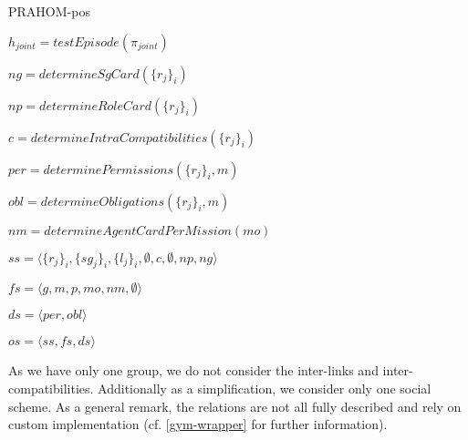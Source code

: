 \documentclass{ecai}
\newcounter{relation}
\begin{document}
\begin{algorithm}[hbt!]
    \caption{PRAHOM-pos}\label{alg:PRAHOM-pos}

    $h_{joint} = testEpisode(\pi_{joint})$


    $ng = determineSgCard(\{r_j\}_i)$

    $np = determineRoleCard(\{r_j\}_i)$

    $c = determineIntraCompatibilities(\{r_j\}_i)$

    $per = determinePermissions(\{r_j\}_i, m)$

    $obl = determineObligations(\{r_j\}_i, m)$

    $nm = determineAgentCardPerMission(mo)$

    $ss = \langle \{r_j\}_i, \{sg_j\}_i, \{l_j\}_i, \emptyset, c, \emptyset, np, ng \rangle$

    $fs = \langle {g, m, p, mo, nm}, \emptyset \rangle$

    $ds = \langle per, obl \rangle$

    $os = \langle ss, fs, ds \rangle$

\end{algorithm}

As we have only one group, we do not consider the inter-links and inter-compatibilities. Additionally as a simplification, we consider only one social scheme. As a general remark, the  relations are not all fully described and rely on custom implementation (cf. \autoref{gym-wrapper} for further information).
\end{document}
